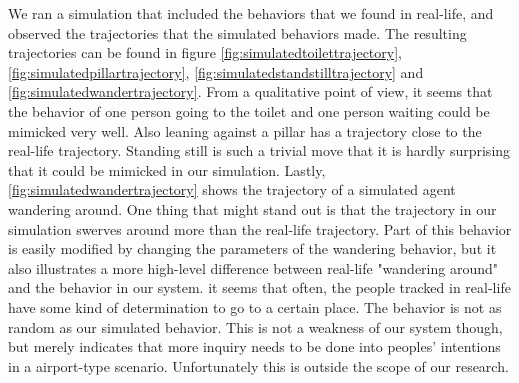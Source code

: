\documentclass[11pt, a4paper]{book}
\begin{document}
We ran a simulation that included the behaviors that we found in real-life, and observed the trajectories that the simulated behaviors made. The resulting trajectories can be found in figure \ref{fig:simulatedtoilettrajectory}, \ref{fig:simulatedpillartrajectory}, \ref{fig:simulatedstandstilltrajectory} and \ref{fig:simulatedwandertrajectory}. From a qualitative point of view, it seems that the behavior of one person going to the toilet and one person waiting could be mimicked very well. Also leaning against a pillar has a trajectory close to the real-life trajectory. Standing still is such a trivial move that it is hardly surprising that it could be mimicked in our simulation. Lastly, \ref{fig:simulatedwandertrajectory} shows the trajectory of a simulated agent wandering around. One thing that might stand out is that the trajectory in our simulation swerves around more than the real-life trajectory. Part of this behavior is easily modified by changing the parameters of the wandering behavior, but it also illustrates a more high-level difference between real-life "wandering around" and the behavior in our system. it seems that often, the people tracked in real-life have some kind of determination to go to a certain place. The behavior is not as random as our simulated behavior. This is not a weakness of our system though, but merely indicates that more inquiry needs to be done into peoples' intentions in a airport-type scenario. Unfortunately this is outside the scope of our research.
\end{document}
